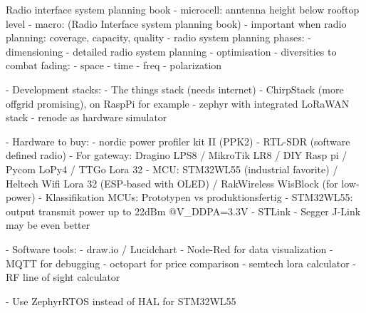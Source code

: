 Radio interface system planning book
- microcell: anntenna height below rooftop level
- macro: (Radio Interface system planning book)
- important when radio planning: coverage, capacity, quality
- radio system planning phases:
  - dimensioning
  - detailed radio system planning 
  - optimisation
- diversities to combat fading:
  - space
  - time 
  - freq
  - polarization 

- Development stacks:
  - The things stack (needs internet)
  - ChirpStack (more offgrid promising), on RaspPi for example
  - zephyr with integrated LoRaWAN stack 
  - renode as hardware simulator
  
- Hardware to buy:
  - nordic power profiler kit II (PPK2)
  - RTL-SDR (software defined radio)
  - For gateway: Dragino LPS8 / MikroTik LR8 / DIY Rasp pi / Pycom LoPy4 / TTGo Lora 32
  - MCU: STM32WL55 (industrial favorite) / Heltech Wifi Lora 32 (ESP-based with OLED) / RakWireless WisBlock (for low-power)
  - Klassifikation MCUs: Prototypen vs produktionsfertig
  - STM32WL55: output transmit power up to 22dBm @V_DDPA=3.3V
  - STLink
  - Segger J-Link may be even better

- Software tools:
  - draw.io / Lucidchart
  - Node-Red for data visualization
  - MQTT for debugging
  - octopart for price comparison
  - semtech lora calculator
  - RF line of sight calculator

- Use ZephyrRTOS instead of HAL for STM32WL55
